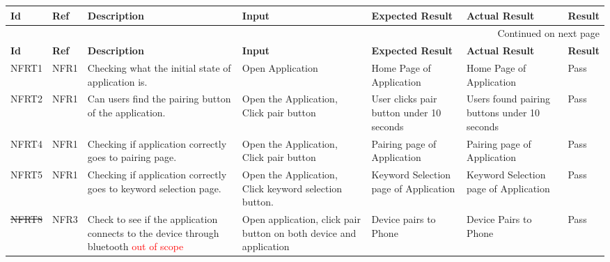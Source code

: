 \documentclass[12pt, titlepage]{article}
\begin{document}
\begin{longtable}{|p{1.4cm}|p{1.1cm}|p{2.5cm}|p{1.5cm}|p{2.2cm}|p{1.9cm}|p{1.2cm}|}

  \endfirsthead
  \hline
  \textbf{Id} & \textbf{Ref} & \textbf{Description}                                                         & \textbf{Input}                                    & \textbf{Expected Result}                                    & \textbf{Actual Result} & \textbf{Result}                                    \\ \hline

  \endhead

  \hline \multicolumn{7}{|r|}{Continued on next page} \\ \hline
  \endfoot
   
\endlastfoot
  \hline
  \textbf{Id} & \textbf{Ref} & \textbf{Description}                                                         & \textbf{Input}                                    & \textbf{Expected Result}    & \textbf{Actual Result}                          & \textbf{Result}                                     \\ \hline
  NFRT1        & NFR1          & Checking what the initial state of application is.              & Open Application                          & Home Page of Application                      & Home Page of Application                        & {\color[HTML]{32CB00} Pass}                         \\ \hline
  NFRT2        & NFR1          & Can users find the pairing button of the application.           & Open the Application, Click pair button   & User clicks pair button under 10 seconds      & Users found pairing buttons under 10 seconds    & {\color[HTML]{32CB00} Pass}                         \\ \hline
  NFRT4        & NFR1          & Checking if application correctly goes to pairing page.         & Open the Application, Click pair button   & Pairing page of Application                   & Pairing page of Application                     & {\color[HTML]{32CB00} Pass}                         \\ \hline
  NFRT5        & NFR1          & Checking if application correctly goes to keyword selection page.& Open the Application, Click keyword selection button.& Keyword Selection page of Application& Keyword Selection page of Application        & {\color[HTML]{32CB00} Pass}                         \\ \hline
 \sout{NFRT8}       & NFR3          & Check to see if the application connects to the device through bluetooth \textcolor{red}{out of scope} & Open application, click pair button on both device and application&Device pairs to Phone&Device Pairs to Phone                       & {\color[HTML]{32CB00} Pass}                        \\ \hline

\end{longtable}
\end{document}
